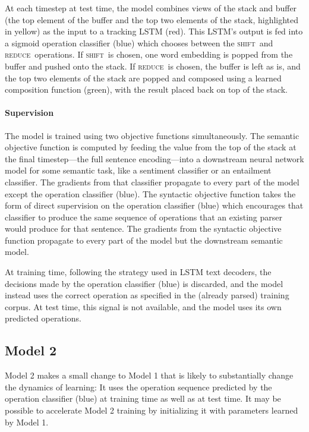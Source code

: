 \documentclass[11pt,letterpaper]{article}
\newcommand{\shift}{\textsc{shift}}
\newcommand{\reduce}{\textsc{reduce}}
\begin{document}
At each timestep at test time, the model combines views of the stack and buffer (the top element of the buffer and the top two elements of the stack, highlighted in yellow) as the input to a tracking LSTM (red). This LSTM's output is fed into a sigmoid operation classifier (blue) which chooses between the \shift~and \reduce~operations. If \shift~is chosen, one word embedding is popped from the buffer and pushed onto the stack. If \reduce~is chosen, the buffer is left as is, and the top two elements of the stack are popped and composed using a learned composition function (green), with the result placed back on top of the stack.

\paragraph{Supervision} The model is trained using two objective functions simultaneously. The semantic objective function is computed by feeding the value from the top of the stack at the final timestep---the full sentence encoding---into a downstream neural network model for some semantic task, like a sentiment classifier or an entailment classifier. The gradients from that classifier propagate to every part of the model except the operation classifier (blue). The syntactic objective function takes the form of direct supervision on the operation classifier (blue) which encourages that classifier to produce the same sequence of operations that an existing parser would produce for that sentence. The gradients from the syntactic objective function propagate to every part of the model but the downstream semantic model.

At training time, following the strategy used in LSTM text decoders, the decisions made by the operation classifier (blue) is discarded, and the model instead uses the correct operation as specified in the (already parsed) training corpus. At test time, this signal is not available, and the model uses its own predicted operations.

\subsection{Model 2}

Model 2 makes a small change to Model 1 that is likely to substantially change the dynamics of learning: It uses the operation sequence predicted by the operation classifier (blue) at training time as well as at test time. It may be possible to accelerate Model 2 training by initializing it with parameters learned by Model 1.
\end{document}
